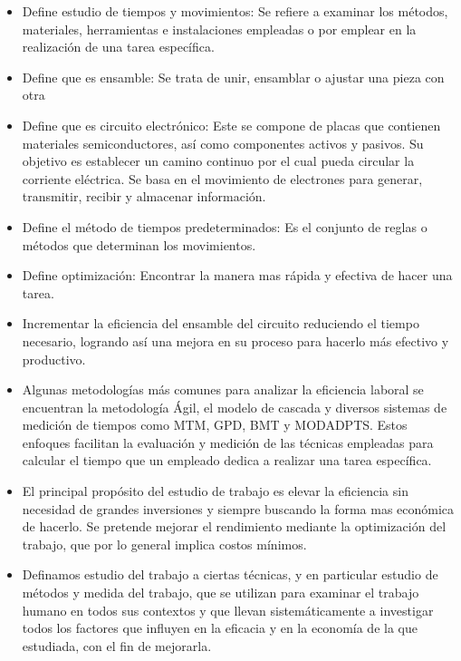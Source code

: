     
    \begin{itemize}
    
        \item Define estudio de tiempos y movimientos: Se refiere a examinar los métodos, materiales, herramientas e instalaciones empleadas o por emplear en la realización de una tarea específica.\cite{neira2006tecnicas}
        \item Define que es ensamble: Se trata de unir, ensamblar o ajustar una pieza con otra\cite{Ensamble}
        \item Define que es circuito electrónico: Este se compone de placas que contienen materiales semiconductores, así como componentes activos y pasivos. Su objetivo es establecer un camino continuo por el cual pueda circular la corriente eléctrica. Se basa en el movimiento de electrones para generar, transmitir, recibir y almacenar información.
        \item Define el método de tiempos predeterminados: Es el conjunto de reglas o métodos que determinan los movimientos. \cite{freivalds2014ingenieria}
        \item Define optimización: Encontrar la manera mas rápida y efectiva de hacer una tarea. \cite{optimización}
        
        \item Incrementar la eficiencia del ensamble del circuito reduciendo el tiempo necesario, logrando así una mejora en su proceso para hacerlo más efectivo y productivo.
        \item Algunas metodologías más comunes para analizar la eficiencia laboral se encuentran la metodología Ágil, el modelo de cascada y diversos sistemas de medición de tiempos como MTM, GPD, BMT y MODADPTS. Estos enfoques facilitan la evaluación y medición de las técnicas empleadas para calcular el tiempo que un empleado dedica a realizar una tarea específica.\cite{freivalds2014ingenieria}
        \item El principal propósito del estudio de trabajo es elevar la eficiencia sin necesidad de grandes inversiones y siempre buscando la forma mas económica de hacerlo. Se pretende mejorar el rendimiento mediante la optimización del trabajo, que por lo general implica costos mínimos.
        \item Definamos estudio del trabajo a ciertas técnicas, y en particular estudio de métodos y medida del trabajo, que se utilizan para examinar el trabajo humano en todos sus contextos y que llevan sistemáticamente a investigar todos los factores que influyen en la eficacia y en la economía de la que estudiada, con el fin de mejorarla. 
        \cite{neira2006tecnicas}
        
    \end{itemize}
